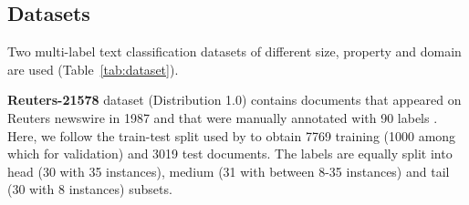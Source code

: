 \documentclass[11pt]{article}
\begin{document}
\subsection{Datasets}
Two multi-label text classification datasets of different size, property and domain are used (Table~\ref{tab:dataset}).

\begin{table}
\caption{Dataset Statistics}

\label{tab:dataset}
\end{table}



\textbf{Reuters-21578} dataset (Distribution 1.0) contains documents that appeared on Reuters newswire in 1987 and that were manually annotated with 90 labels  \citep{Reuters}. Here, we follow the train-test split used by \citep{yang-1999} to obtain 7769 training (1000 among which for validation) and 3019 test documents. The labels are equally split into head (30 with  35 instances), medium (31 with between 8-35 instances) and tail (30 with  8 instances) subsets.
\end{document}
